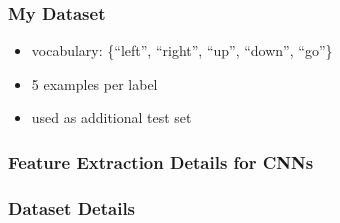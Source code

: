 \begin{frame}
  \frametitle{My Dataset}
  \vspace{-0.75cm}
  \begin{itemize}
    \item vocabulary: \{\enquote{left}, \enquote{right}, \enquote{up}, \enquote{down}, \enquote{go}\}
    \item 5 examples per label
    \item used as additional test set
  \end{itemize}
  \begin{figure}[!ht]
    \centering
  \end{figure}
\end{frame}


\begin{frame}
  \frametitle{Feature Extraction Details for CNNs}
  
\end{frame}

\begin{frame}
  \frametitle{Dataset Details}
  
\end{frame}

